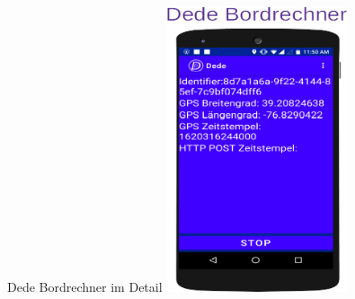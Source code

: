 \begin{frame}{Dede Bordrechner im Detail}
  \center\includegraphics[width=0.4\textwidth]{otm-june-2-2021/dede-on-board-computer-only-june-04.png}
\end{frame}

